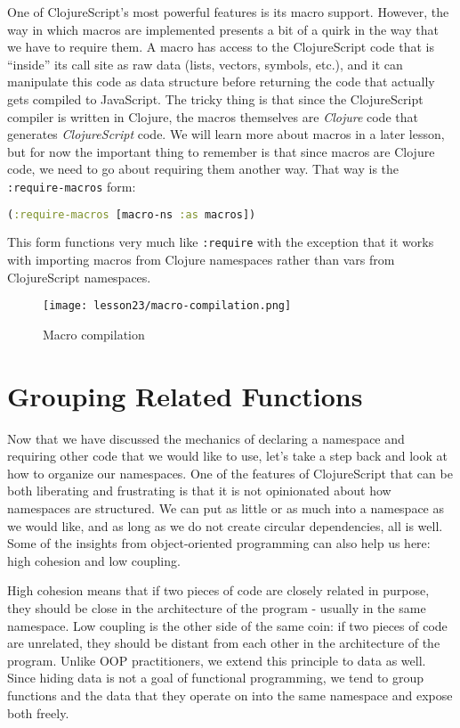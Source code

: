 \documentclass[10pt,twoside,openright]{memoir}
\begin{document}
One of ClojureScript's most powerful features is its macro support.
However, the way in which macros are implemented presents a bit of a
quirk in the way that we have to require them. A macro has access to the
ClojureScript code that is ``inside'' its call site as raw data (lists,
vectors, symbols, etc.), and it can manipulate this code as data
structure before returning the code that actually gets compiled to
JavaScript. The tricky thing is that since the ClojureScript compiler is
written in Clojure, the macros themselves are \emph{Clojure} code that
generates \emph{ClojureScript} code. We will learn more about macros in
a later lesson, but for now the important thing to remember is that
since macros are Clojure code, we need to go about requiring them
another way. That way is the \texttt{:require-macros} form:

\begin{lstlisting}[language=Clojure]
(:require-macros [macro-ns :as macros])
\end{lstlisting}

This form functions very much like \texttt{:require} with the exception
that it works with importing macros from Clojure namespaces rather than
vars from ClojureScript namespaces.

\begin{figure}[H]
\caption{Macro compilation}
\centering
\texttt{[image: lesson23/macro-compilation.png]}
\end{figure}


\section{Grouping Related Functions}

Now that we have discussed the mechanics of declaring a namespace and
requiring other code that we would like to use, let's take a step back
and look at how to organize our namespaces. One of the features of
ClojureScript that can be both liberating and frustrating is that it is
not opinionated about how namespaces are structured. We can put as
little or as much into a namespace as we would like, and as long as we
do not create circular dependencies, all is well. Some of the insights
from object-oriented programming can also help us here: high cohesion
and low coupling.

High cohesion means that if two pieces of code are closely related in
purpose, they should be close in the architecture of the program -
usually in the same namespace. Low coupling is the other side of the
same coin: if two pieces of code are unrelated, they should be distant
from each other in the architecture of the program. Unlike OOP
practitioners, we extend this principle to data as well. Since hiding
data is not a goal of functional programming, we tend to group functions
and the data that they operate on into the same namespace and expose
both freely.
\end{document}
